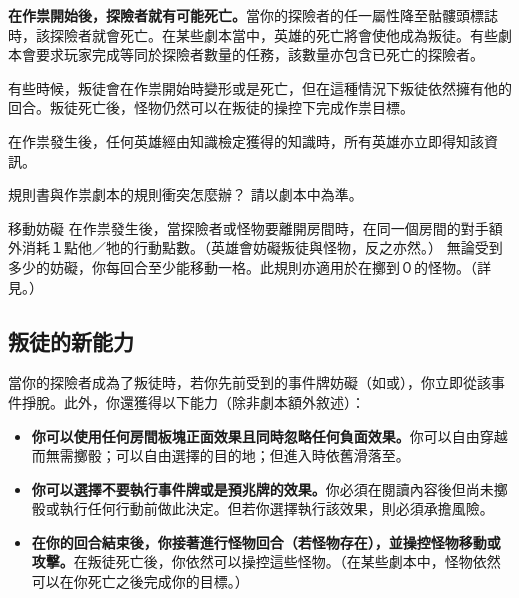 \textbf{在作祟開始後，探險者就有可能死亡。}當你的探險者的任一屬性降至骷髏頭標誌\SkullSymbol{}時，該探險者就會死亡。在某些劇本當中，英雄的死亡將會使他成為叛徒。有些劇本會要求玩家完成等同於探險者數量的任務，該數量亦包含已死亡的探險者。

有些時候，叛徒會在作祟開始時變形或是死亡，但在這種情況下叛徒依然擁有他的回合。叛徒死亡後，怪物仍然可以在叛徒的操控下完成作祟目標。

在作祟發生後，任何英雄經由知識檢定獲得的知識時，所有英雄亦立即得知該資訊。

\begin{RuleBox}{規則書與作祟劇本的規則衝突怎麼辦？}
	請以劇本中為準。
\end{RuleBox}

\begin{RuleBox}{移動妨礙}
	在作祟發生後，當探險者或怪物要離開房間時，在同一個房間的對手額外消耗１點他／牠的行動點數。（英雄會妨礙叛徒與怪物，反之亦然。）
	無論受到多少的妨礙，你每回合至少能移動一格。此規則亦適用於在擲到０的怪物。（詳見。）
\end{RuleBox}


\subsection{叛徒的新能力}\label{ssec:traitors-new-power}

當你的探險者成為了叛徒時，若你先前受到的事件牌妨礙（如或），你立即從該事件掙脫。此外，你還獲得以下能力（除非劇本額外敘述）：

\begin{itemize}
	\item \textbf{你可以使用任何房間板塊正面效果且同時忽略任何負面效果。}你可以自由穿越而無需擲骰；可以自由選擇的目的地；但進入時依舊滑落至。
	\item \textbf{你可以選擇不要執行事件牌或是預兆牌的效果。}你必須在閱讀內容後但尚未擲骰或執行任何行動前做此決定。但若你選擇執行該效果，則必須承擔風險。
	\item \textbf{在你的回合結束後，你接著進行怪物回合（若怪物存在），並操控怪物移動或攻擊。}在叛徒死亡後，你依然可以操控這些怪物。（在某些劇本中，怪物依然可以在你死亡之後完成你的目標。）
\end{itemize}

